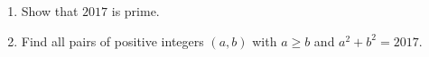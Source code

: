 \begin{enumerate}
\item[(a)] Show that $2017$ is prime.
\item[(b)] Find all pairs of positive integers $(a,b)$ with $a\ge b$ and $a^2+b^2=2017$.
\end{enumerate}
